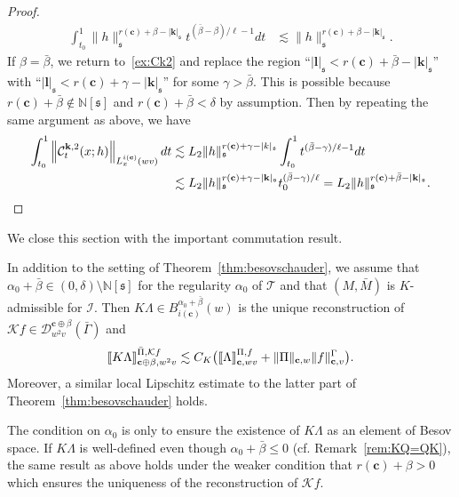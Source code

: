 \documentclass[AHL,Unicode,longabstracts,published]{cedram}
\newcommand{\bbN}{\mathbb{N}}
\newcommand{\mfs}{\mathfrak{s}}
\newcommand{\bfc}{\mathbf{c}}
\newcommand{\bfcpb}{\mathbf{c}\oplus\beta}
\newcommand{\bfk}{\mathbf{k}}
\newcommand{\bfl}{\mathbf{l}}
\newcommand{\mcD}{\mathcal{D}}
\newcommand{\mcK}{\mathcal{K}}
\newcommand{\mcI}{\mathcal{I}}
\newcommand{\mcC}{\mathcal{C}}
\newcommand{\scT}{\mathscr{T}}
\newcommand{\llbracket}{\mathopen{[\mkern -2.7mu[}}
\newcommand{\rrbracket}{\mathclose{]\mkern -2.7mu]}}
\newcommand{\lb}{\llbracket}
\newcommand{\rb}{\rrbracket}
\begin{document}
\begin{proof}
\begin{align*}
\int_{t_0}^1\|h\|_{\mfs}^{r(\bfc)+\beta-|{\bfk}|_\mfs}t^{(\bar\beta-\beta)/\ell-1}dt &\lesssim\|h\|_{\mfs}^{r(\bfc)+\beta-|{\bfk}|_\mfs}.
\end{align*}
If $\beta=\bar\beta$, we return to~\eqref{ex:Ck2} and replace the region ``$|{\bfl}|_\mfs<r(\bfc)+\bar\beta-|{\bfk}|_\mfs$'' with ``$|{\bfl}|_\mfs<r(\bfc)+\gamma-|{\bfk}|_\mfs$'' for some $\gamma>\bar\beta$. This is possible because $r(\bfc)+\bar\beta\notin\bbN[\mfs]$ and $r(\bfc)+\bar\beta<\delta$ by assumption. Then by repeating the same argument as above, we have
\begin{align*}
\int_{t_0}^1\left\|\mcC_t^{{\bfk},2}(x;h)\right\|_{L_x^{i(\bfc)}(wv)}dt &\lesssim L_2\|h\|_{\mfs}^{r(\bfc)+\gamma-|k|_{\mfs}}\int_{t_0}^1t^{(\bar\beta-\gamma)/\ell-1}dt\\
&\lesssim L_2\|h\|_{\mfs}^{r(\bfc)+\gamma-|{\bfk}|_\mfs}t_0^{(\bar\beta-\gamma)/\ell} =L_2\|h\|_\mfs^{r(\bfc)+\bar\beta-|{\bfk}|_\mfs}.\qedhere
\end{align*}
\end{proof}

We close this section with the important commutation result.

\begin{theo}\label{thm:KR=RK}
In addition to the setting of Theorem~\ref{thm:besovschauder}, we assume that $\alpha_0+\bar\beta\in(0,\delta)\setminus\bbN[\mfs]$ for the regularity $\alpha_0$ of $\scT$ and that $(M,\bar{M})$ is $K$-admissible for $\mcI$. Then $K\Lambda\in B_{i(\bfc)}^{\alpha_0+\bar\beta}(w)$ is the unique reconstruction of $\mcK f\in\mcD_{w^2v}^{\bfcpb}(\bar\Gamma)$ and
\[
\lb K\Lambda\rb_{\bfcpb,w^2v}^{\bar{\Pi},\mcK f}\lesssim C_K\big(\lb\Lambda\rb_{\bfc,wv}^{\Pi,f}+\|\Pi\|_{\bfc,w}\|f\|_{\bfc,v}^\Gamma\big).
\]
Moreover, a similar local Lipschitz estimate to the latter part of Theorem~\ref{thm:besovschauder} holds.
\end{theo}

\begin{rema}
The condition on $\alpha_0$ is only to ensure the existence of $K\Lambda$ as an element of Besov space. If $K\Lambda$ is well-defined even though $\alpha_0+\bar\beta\le0$ (cf. Remark~\ref{rem:KQ=QK}), the same result as above holds under the weaker condition that $r(\bfc)+\beta>0$ which ensures the uniqueness of the reconstruction of $\mcK f$.
\end{rema}
\end{document}
